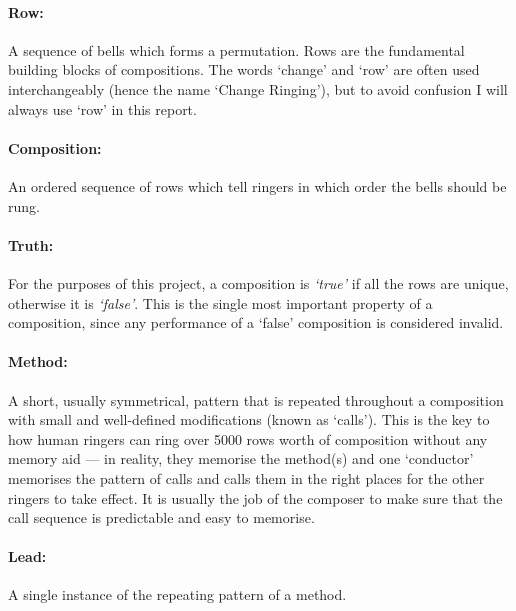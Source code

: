 \documentclass[12pt]{article}
\begin{document}
\paragraph{Row:} A sequence of bells which forms a permutation.  Rows are the fundamental building
blocks of compositions.  The words `change' and `row' are often used interchangeably (hence the name
`Change Ringing'), but to avoid confusion I will always use `row' in this report.

\paragraph{Composition:} An ordered sequence of rows which tell ringers in which order the bells
should be rung.

\paragraph{Truth:} For the purposes of this project, a composition is \emph{`true'} if all the rows
are unique, otherwise it is \emph{`false'}.  This is the single most important property of a
composition, since any performance of a `false' composition is considered invalid.

\paragraph{Method:} A short, usually symmetrical, pattern that is repeated throughout a composition
with small and well-defined modifications (known as `calls').  This is the key to how human ringers
can ring over 5000 rows worth of composition without any memory aid --- in reality, they memorise
the method(s) and one `conductor' memorises the pattern of calls and calls them in the right places
for the other ringers to take effect.  It is usually the job of the composer to make sure that the
call sequence is predictable and easy to memorise.

\paragraph{Lead:} A single instance of the repeating pattern of a method.
\end{document}
